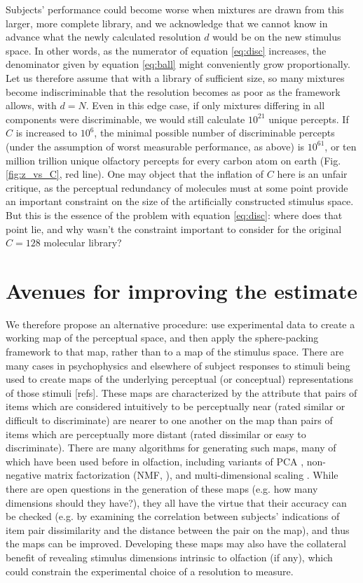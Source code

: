 \documentclass[letterpaper,twocolumn,10pt]{article}
\begin{document}
Subjects' performance could become worse when mixtures are drawn from this larger, more complete library, 
and we acknowledge that we cannot know in advance what the newly calculated resolution $d$ would be on the new stimulus space.  
In other words, as the numerator of equation \ref{eq:disc} increases, 
the denominator given by equation \ref{eq:ball} might conveniently grow proportionally.  
Let us therefore assume that with a library of sufficient size, 
so many mixtures become indiscriminable that the resolution becomes as poor as the framework allows, with $d=N$. 
Even in this edge case, if only mixtures differing in all components were discriminable, 
we would still calculate $10^{21}$ unique percepts. 
If $C$ is increased to $10^6$, 
the minimal possible number of discriminable percepts 
(under the assumption of worst measurable performance, as above) 
is $10^{61}$, or ten million trillion unique olfactory percepts for every carbon atom on earth (Fig. \ref{fig:z_vs_C}, red line). 
One may object that the inflation of $C$ here is an unfair critique, 
as the perceptual redundancy of molecules must at some point provide an important constraint on the size of the artificially constructed stimulus space. 
But this is the essence of the problem with equation \ref{eq:disc}: 
where does that point lie, 
and why wasn’t the constraint important to consider for the original $C=128$ molecular library?

\section{Avenues for improving the estimate}

We therefore propose an alternative procedure: 
use experimental data to create a working map of the perceptual space, 
and then apply the sphere-packing framework to that map, 
rather than to a map of the stimulus space.  
There are many cases in psychophysics and elsewhere of subject responses to stimuli being used 
to create maps of the underlying perceptual (or conceptual) representations of those stimuli [refs].  
These maps are characterized by the attribute that pairs of items which are considered intuitively to be perceptually near 
(rated similar or difficult to discriminate) are nearer to one another on the map than pairs of items 
which are perceptually more distant (rated dissimilar or easy to discriminate).  
There are many algorithms for generating such maps, 
many of which have been used before in olfaction, 
including variants of PCA \cite{khan_predicting_2007,koulakov_in_search_2011,zarzo_identification_2006}, 
non-negative matrix factorization (NMF, \cite{castro_categorical_2013}), 
and multi-dimensional scaling \cite{mamlouk_quantifying_2003}.  
While there are open questions in the generation of these maps 
(e.g. how many dimensions should they have?), 
they all have the virtue that their accuracy can be checked 
(e.g. by examining the correlation between subjects' indications of item pair dissimilarity and the distance between the pair on the map), 
and thus the maps can be improved. 
Developing these maps may also have the collateral benefit of revealing stimulus dimensions intrinsic to olfaction (if any), 
which could constrain the experimental choice of a resolution to measure.
\end{document}
